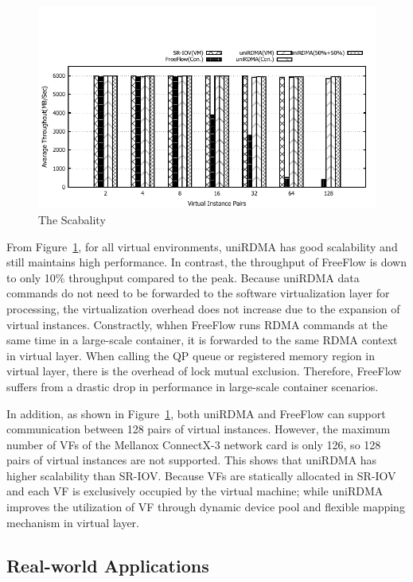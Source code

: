 \begin{figure}[!ht]
	\centering
	\includegraphics[width=1.0\linewidth]{images/scabality.pdf}
	\caption{The Scabality}
	\label{fig:scabality}
\end{figure}

From Figure~\ref{fig:scabality}, for all virtual environments, uniRDMA has good scalability and still maintains high performance. In contrast, the throughput of FreeFlow is down to only 10\% throughput compared to the peak. Because uniRDMA data commands do not need to be forwarded to the software virtualization layer for processing, the virtualization overhead does not increase due to the expansion of virtual instances. Constractly, whhen FreeFlow runs RDMA commands at the same time in a large-scale container, it is forwarded to the same RDMA context in virtual layer. When calling the QP queue or registered memory region in virtual layer, there is the overhead of lock mutual exclusion. Therefore, FreeFlow suffers from a drastic drop in performance in large-scale container scenarios.

In addition, as shown in Figure~\ref{fig:scabality}, both uniRDMA and FreeFlow can support communication between 128 pairs of virtual instances. However, the maximum number of VFs of the Mellanox ConnectX-3 network card is only 126, so 128 pairs of virtual instances are not supported. This shows that uniRDMA has higher scalability than SR-IOV. Because VFs are statically allocated in SR-IOV and each VF is exclusively occupied by the virtual machine; while uniRDMA improves the utilization of VF through  dynamic device pool and flexible mapping mechanism in virtual layer.

\subsection{Real-world Applications}

